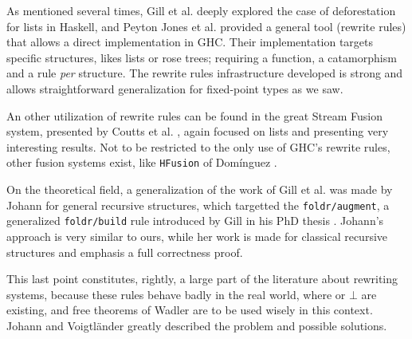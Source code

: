 
As mentioned several times, Gill et al. \cite{Gill:1993:SCD:165180.165214} deeply explored the case of deforestation for lists in Haskell, and Peyton Jones et al. \cite{pbr} provided a general tool (rewrite rules) that allows a direct implementation in GHC. Their implementation targets specific structures, likes lists or rose trees; requiring a  function, a catamorphism and a rule \emph{per} structure. The rewrite rules infrastructure developed is strong and allows straightforward generalization for fixed-point types as we saw.

An other utilization of rewrite rules can be found in the great Stream Fusion system, presented by Coutts et al. \cite{Coutts07streamfusion}, again focused on lists and presenting very interesting results.
Not to be restricted to the only use of GHC's rewrite rules, other fusion systems exist, like \verb|HFusion| of Domínguez \cite{dominguez:hfusion}.

On the theoretical field, a generalization of the work of Gill et al. \cite{Gill:1993:SCD:165180.165214} was made by Johann \cite{Johann:2002:GSF:641433.641471} for general recursive structures, which targetted the \verb|foldr/augment|, a generalized \verb|foldr/build| rule introduced by Gill in his PhD thesis \cite{Gill1996CheapDF}. Johann's approach is very similar to ours, while her work is made for classical recursive structures and emphasis a full correctness proof.

This last point constitutes, rightly, a large part of the literature about rewriting systems, because these rules behave badly in the real world, where  or $\bot$ are existing, and free theorems of Wadler \cite{Wadler:1989:TF:99370.99404} are to be used wisely in this context. Johann and Voigtländer \cite{JV04} greatly described the problem and possible solutions.

